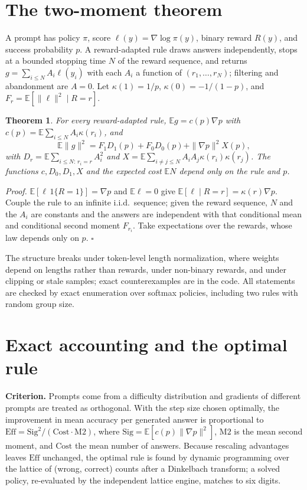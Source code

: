 \documentclass[11pt]{article}
\newtheorem{theorem}{Theorem}
\newcommand{\E}{\mathbb{E}}
\begin{document}
\section{The two-moment theorem}\label{sec:theory}
A prompt has policy $\pi$, score $\ell(y)=\nabla\log\pi(y)$, binary reward $R(y)$, and success probability $p$. A reward-adapted rule draws answers independently, stops at a bounded stopping time $N$ of the reward sequence, and returns $g=\sum_{i\le N}A_i\ell(y_i)$ with each $A_i$ a function of $(r_1,\dots,r_N)$; filtering and abandonment are $A=0$. Let $\kappa(1)=1/p$, $\kappa(0)=-1/(1-p)$, and $F_r=\E[\|\ell\|^2\mid R=r]$.

\begin{theorem}
For every reward-adapted rule, $\E g=c(p)\nabla p$ with $c(p)=\E\sum_{i\le N}A_i\kappa(r_i)$, and
\[
\E\|g\|^2=F_1D_1(p)+F_0D_0(p)+\|\nabla p\|^2X(p),
\]
with $D_r=\E\sum_{i\le N:\,r_i=r}A_i^2$ and $X=\E\sum_{i\neq j\le N}A_iA_j\kappa(r_i)\kappa(r_j)$. The functions $c,D_0,D_1,X$ and the expected cost $\E N$ depend only on the rule and $p$.
\end{theorem}
\emph{Proof.} $\E[\ell\,1\{R=1\}]=\nabla p$ and $\E\ell=0$ give $\E[\ell\mid R=r]=\kappa(r)\nabla p$. Couple the rule to an infinite i.i.d.\ sequence; given the reward sequence, $N$ and the $A_i$ are constants and the answers are independent with that conditional mean and conditional second moment $F_{r_i}$. Take expectations over the rewards, whose law depends only on $p$. $\square$

The structure breaks under token-level length normalization, where weights depend on lengths rather than rewards, under non-binary rewards, and under clipping or stale samples; exact counterexamples are in the code. All statements are checked by exact enumeration over softmax policies, including two rules with random group size.

\section{Exact accounting and the optimal rule}\label{sec:optimal}
\textbf{Criterion.} Prompts come from a difficulty distribution and gradients of different prompts are treated as orthogonal. With the step size chosen optimally, the improvement in mean accuracy per generated answer is proportional to $\mathrm{Eff}=\mathrm{Sig}^2/(\mathrm{Cost}\cdot\mathrm{M2})$, where $\mathrm{Sig}=\E[c(p)\|\nabla p\|^2]$, $\mathrm{M2}$ is the mean second moment, and $\mathrm{Cost}$ the mean number of answers. Because rescaling advantages leaves $\mathrm{Eff}$ unchanged, the optimal rule is found by dynamic programming over the lattice of (wrong, correct) counts after a Dinkelbach transform; a solved policy, re-evaluated by the independent lattice engine, matches to six digits.
\end{document}
